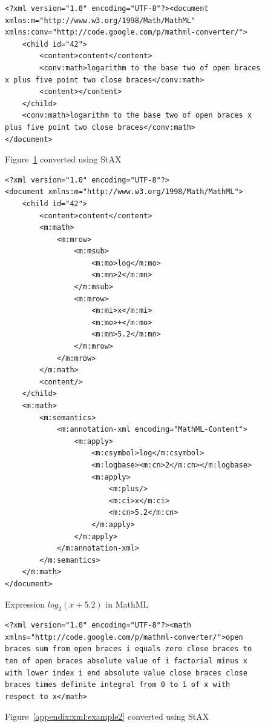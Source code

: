 \documentclass[11pt,oneside,final]{fithesis2}
\begin{document}
\begin{figure}[!ht]
\lstset{language=XML,frame=lines}
\begin{lstlisting}
<?xml version="1.0" encoding="UTF-8"?><document xmlns:m="http://www.w3.org/1998/Math/MathML" xmlns:conv="http://code.google.com/p/mathml-converter/">
	<child id="42">
		<content>content</content>		
		<conv:math>logarithm to the base two of open braces x plus five point two close braces</conv:math>
		<content></content>
	</child>
	<conv:math>logarithm to the base two of open braces x plus five point two close braces</conv:math>
</document>
\end{lstlisting}
\caption{Figure~\ref{appendix:xml:example1} converted using StAX}
\end{figure}

\begin{figure}[!ht]
\lstset{language=XML,frame=lines}
\begin{lstlisting}
<?xml version="1.0" encoding="UTF-8"?>
<document xmlns:m="http://www.w3.org/1998/Math/MathML">
	<child id="42">
		<content>content</content>		
		<m:math>
			<m:mrow>
				<m:msub>
					<m:mo>log</m:mo>
					<m:mn>2</m:mn>
				</m:msub>
				<m:mrow>
					<m:mi>x</m:mi>
					<m:mo>+</m:mo>
					<m:mn>5.2</m:mn>
				</m:mrow>
			</m:mrow>			
		</m:math>
		<content/>
	</child>
	<m:math>
		<m:semantics>
			<m:annotation-xml encoding="MathML-Content">
				<m:apply>
					<m:csymbol>log</m:csymbol>
					<m:logbase><m:cn>2</m:cn></m:logbase>
					<m:apply>
						<m:plus/>
						<m:ci>x</m:ci>
						<m:cn>5.2</m:cn>
					</m:apply>
				</m:apply>
			</m:annotation-xml>
		</m:semantics>
	</m:math>
</document>
\end{lstlisting}
\caption{Expression $log_2 (x+5.2)$ in MathML}
\label{appendix:xml:example1}
\end{figure}

\begin{figure}[!ht]
\lstset{language=XML,frame=lines}
\begin{lstlisting}
<?xml version="1.0" encoding="UTF-8"?><math xmlns="http://code.google.com/p/mathml-converter/">open braces sum from open braces i equals zero close braces to ten of open braces absolute value of i factorial minus x with lower index i end absolute value close braces close braces times definite integral from 0 to 1 of x with respect to x</math>
\end{lstlisting}
\caption{Figure~\ref{appendix:xml:example2} converted using StAX}
\end{figure}
\end{document}
